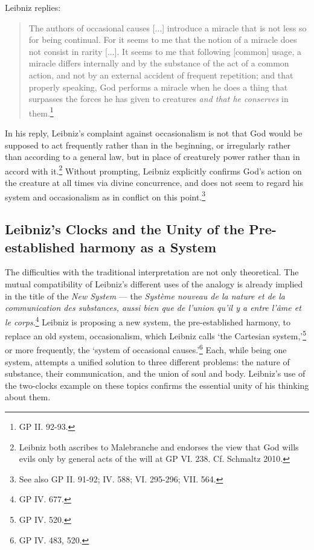 \documentclass{article}
\begin{document}
Leibniz replies:

\begin{quote}
The authors of occasional causes {[}...{]} introduce a miracle that is
not less so for being continual. For it seems to me that the notion of a
miracle does not consist in rarity {[}...{]}. It seems to me that
following {[}common{]} usage, a miracle differs internally and by the
substance of the act of a common action, and not by an external accident
of frequent repetition; and that properly speaking, God performs a
miracle when he does a thing that surpasses the forces he has given to
creatures \emph{and that he conserves} in them.\footnote{GP II. 92-93.}
\end{quote}

In his reply, Leibniz's complaint against occasionalism is not that God
would be supposed to act frequently rather than in the beginning, or
irregularly rather than according to a general law, but in place of
creaturely power rather than in accord with it.\footnote{Leibniz both
  ascribes to Malebranche and endorses the view that God wills evils
  only by general acts of the will at GP VI. 238. Cf. Schmaltz 2010.}
Without prompting, Leibniz explicitly confirms God's action on the
creature at all times via divine concurrence, and does not seem to
regard his system and occasionalism as in conflict on this
point.\footnote{See also GP II. 91-92; IV. 588; VI. 295-296; VII. 564.}

\subsection{Leibniz's Clocks and the Unity of the Pre-established
harmony as a
System}

The difficulties with the traditional interpretation are not only
theoretical. The mutual compatibility of Leibniz's different uses of the
analogy is already implied in the title of the \emph{New System} --- the
\emph{Système nouveau de la nature et de la communication des
substances, aussi bien que de l'union qu'il y a entre l'âme et le
corps}.\footnote{GP IV. 677.} Leibniz is proposing a new system, the
pre-established harmony, to replace an old system, occasionalism, which
Leibniz calls `the Cartesian system,'\footnote{GP IV. 520.} or more
frequently, the `system of occasional causes.'\footnote{GP IV. 483, 520.}
Each, while being one system, attempts a unified solution to three
different problems: the nature of substance, their communication, and
the union of soul and body. Leibniz's use of the two-clocks example on
these topics confirms the essential unity of his thinking about them.
\end{document}
